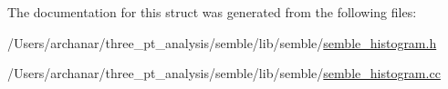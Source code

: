 The documentation for this struct was generated from the following files\+:\begin{DoxyCompactItemize}
\item 
/\+Users/archanar/three\+\_\+pt\+\_\+analysis/semble/lib/semble/\mbox{\hyperlink{lib_2semble_2semble__histogram_8h}{semble\+\_\+histogram.\+h}}\item 
/\+Users/archanar/three\+\_\+pt\+\_\+analysis/semble/lib/semble/\mbox{\hyperlink{semble__histogram_8cc}{semble\+\_\+histogram.\+cc}}\end{DoxyCompactItemize}
